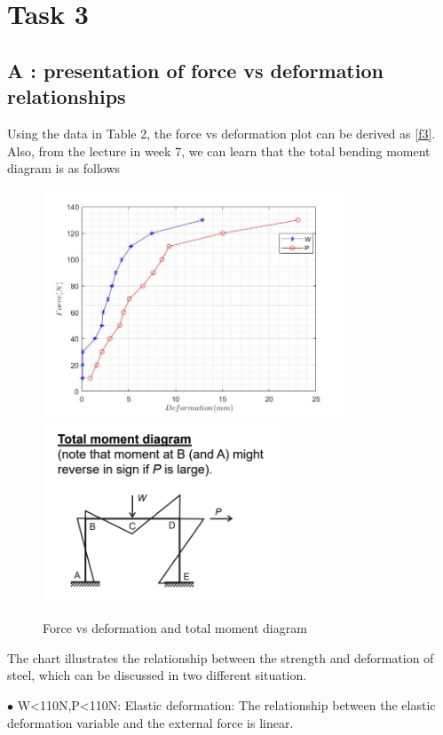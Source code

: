 \section{Task 3}
\FloatBarrier %



\iffalse
\subsection*{A : presentation of force vs deformation relationships}
Using the data in Table 2, the force vs deformation plot can be derived as \autoref{f3}. Also, from the lecture in week 7, we can learn that the total bending moment diagram is as follows


\begin{figure}[htbp]
    \centering
    \includegraphics[width=9cm]{./fig/17.jpg}
    \includegraphics[width=7cm]{./fig/16.png}
    \caption{Force vs deformation and total moment diagram}
    \label{f4}
\end{figure}


The chart illustrates the relationship between the strength and deformation of steel, which can be discussed in two different situation.

$\bullet$ W<110N,P<110N: Elastic deformation: The relationship between the elastic deformation variable and the external force is linear.

